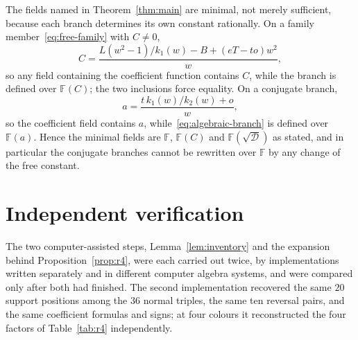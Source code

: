 \documentclass[
  aps,pre,
  reprint,
  superscriptaddress,
  amsmath,amssymb,
  floatfix
]{revtex4-2}
\theoremstyle{plain}
\theoremstyle{definition}
\theoremstyle{remark}
\newcommand{\Fld}{\mathbb{F}}
\newcommand{\Disc}{\mathcal{D}}
\begin{document}
The fields named in Theorem~\ref{thm:main} are minimal, not merely sufficient,
because each branch determines its own constant rationally. On a family
member~\eqref{eq:free-family} with $C\neq0$,
\begin{equation}
 C=\frac{L(w^2-1)/k_1(w)-B+(eT-to)w^2}{w},
 \label{eq:recover-c}
\end{equation}
so any field containing the coefficient function contains $C$, while the branch
is defined over $\Fld(C)$; the two inclusions force equality. On a conjugate
branch,
\begin{equation}
 a=\frac{t\,k_1(w)/k_2(w)+o}{w},
 \label{eq:recover-a}
\end{equation}
so the coefficient field contains $a$, while~\eqref{eq:algebraic-branch} is
defined over $\Fld(a)$. Hence the minimal fields are $\Fld$, $\Fld(C)$ and
$\Fld(\sqrt{\Disc})$ as stated, and in particular the conjugate branches cannot
be rewritten over $\Fld$ by any change of the free constant.

\section{Independent verification}
\label{sec:verification}

The two computer-assisted steps, Lemma~\ref{lem:inventory} and the expansion
behind Proposition~\ref{prop:r4}, were each carried out twice, by
implementations written separately and in different computer algebra systems,
and were compared only after both had finished. The second implementation
recovered the same $20$ support positions among the $36$ normal triples, the
same ten reversal pairs, and the same coefficient formulas and signs; at four
colours it reconstructed the four factors of Table~\ref{tab:r4} independently.
\end{document}
